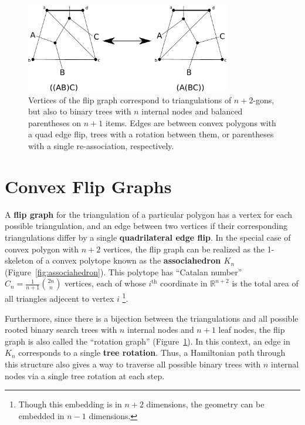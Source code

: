 \documentclass[english]{socg-lipics-v2021}
\begin{document}
\begin{figure}
    \centering
    \includegraphics[width=0.8\textwidth]{correspondences.pdf}
    \caption{Vertices of the flip graph correspond to triangulations of $n+2$-gons, but also to binary trees with $n$ internal nodes and balanced parentheses on $n+1$ items.  Edges are between convex polygons with a quad edge flip, trees with a rotation between them, or parentheses with a single re-association, respectively.}
    \label{fig:correspondences}
\end{figure}



\section{Convex Flip Graphs}

A \textbf{flip graph} for the triangulation of a particular polygon has a vertex for each possible triangulation, and an edge between two vertices if their corresponding triangulations differ by a single \textbf{quadrilateral edge flip}.  In the special case of convex polygon with $n+2$ vertices, the flip graph can be realized as the 1-skeleton of a convex polytope known as the \textbf{associahedron $K_n$} (Figure~\ref{fig:associahedron}).  This polytope has ``Catalan number'' $C_n = \frac{1}{n+1} \binom{2n}{n}$ vertices, each of whose $i^{\text{th}}$ coordinate in $\mathbb{R}^{n+2}$ is the total area of all triangles adjecent to vertex $i$ \footnote{Though this embedding is in $n+2$ dimensions, the geometry can be embedded in $n-1$ dimensions.}.

Furthermore, since there is a bijection between the triangulations and all possible rooted binary search trees with $n$ internal nodes and $n+1$ leaf nodes, the flip graph is also called the ``rotation graph''  \cite{lucas1987rotation} (Figure~\ref{fig:correspondences}).  In this context, an edge in $K_n$ corresponds to a single {\bf tree rotation}.  Thus, a Hamiltonian path through this structure also gives a way to traverse all possible binary trees with $n$ internal nodes via a single tree rotation at each step.
\end{document}
